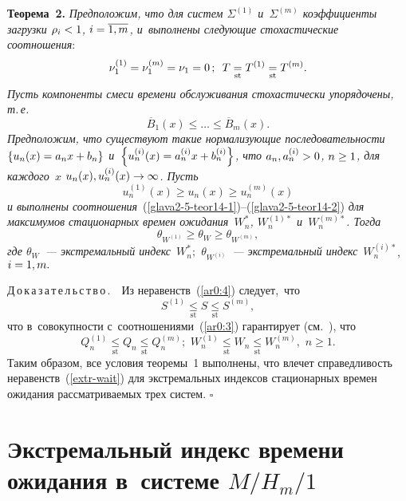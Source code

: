 \begin{multicols}{2}
\noindent
\textbf{Теорема~2.}
\textit{Предположим, что для систем $\Sigma^{(1)}$ и~$\Sigma^{(m)}$  коэффициенты загрузки  $\rho_i\hm<1$, 
$i\hm=\overline{1,m}$, и~выполнены  следующие стохастические соотношения}:
\begin{equation}
\label{ar0:3}
   \nu_1^{(1)}=\nu_1^{(m)}=\nu_1=0\,;\enskip  T\underset{\mathrm{st}}{=}T^{(1)}\underset{\mathrm{st}}{=}T^{(m)}.
\end{equation}
\textit{Пусть компоненты смеси времени обслуживания стохастически упорядочены, т.\,е.}
\begin{equation}
\label{ar0:4}
  \overline B_1(x) \le \dots\le \overline B_m(x).
\end{equation}
\textit{Предположим, что существуют такие нормализующие последовательности 
$\left\{u_n(x)\hm=a_nx\hm+b_n\right\}$ и~$\left\{u_n^{(i)}(x)\hm=a_n^{(i)}x\hm+b_n^{(i)}\right\}$, что $a_n, 
a_n^{(i)} \hm>0$, $n\hm\ge 1$, для каждого~$x$ $u_n(x), u_n^{(i)}(x) \hm\to \infty$.
Пусть}
$$
u_n^{(1)}(x)\ge u_n(x)\ge u_n^{(m)}(x)
$$
\textit{и выполнены соотношения}~(\ref{glava2-5-teor14-1})--(\ref{glava2-5-teor14-2}) \textit{для  
максимумов стационарных времен ожидания~$ W_n^{*}$,  $W_n^{(1)*}$ и~$W_n^{(m)*}$. 
Тогда}
\begin{equation}
\label{extr-wait}
  \theta_{W^{(1)}}\ge  \theta_{W}\ge  \theta_{W^{(m)}},
\end{equation}
\textit{где $\theta_{W}$~--- экстремальный индекс~$W_n^*;$ $\theta_{W^{(i)}}$~--- 
экст\-ре\-маль\-ный индекс}~$W_n^{(i)*}$, $i\hm=1,m.$


\noindent
Д\,о\,к\,а\,з\,а\,т\,е\,л\,ь\,с\,т\,в\,о\,.\ \
 Из неравенств~(\ref{ar0:4}) следует,~что
 $$
  S^{(1)} \underset{\mathrm{st}}{\le} S \underset{\mathrm{st}}{\le} S^{(m)},
  $$
что в~совокупности  с~соотношениями~(\ref{ar0:3}) гарантирует (см.\ \cite[теорема~4]{Whitt}),  что
\begin{equation*}
 Q_n^{(1)} \underset{\mathrm{st}}{\le} Q_n \underset{\mathrm{st}}{\le} Q_n^{(m)};\,\,  W_n^{(1)} 
\underset{\mathrm{st}}{\le} W_n \underset{\mathrm{st}}{\le} W_n^{(m)},\,\, n\ge 1.
\end{equation*}
Таким образом, все условия теоремы~1  выполнены, что влечет справедливость  
неравенств~(\ref{extr-wait}) для экстремальных индексов стационарных времен 
ожидания рассматриваемых трех систем. \hfill $\square$

\vspace*{-6pt}

\section{Экстремальный индекс времени ожидания в~системе $M/H_m/1$}
\label{sec4}


\end{multicols}
